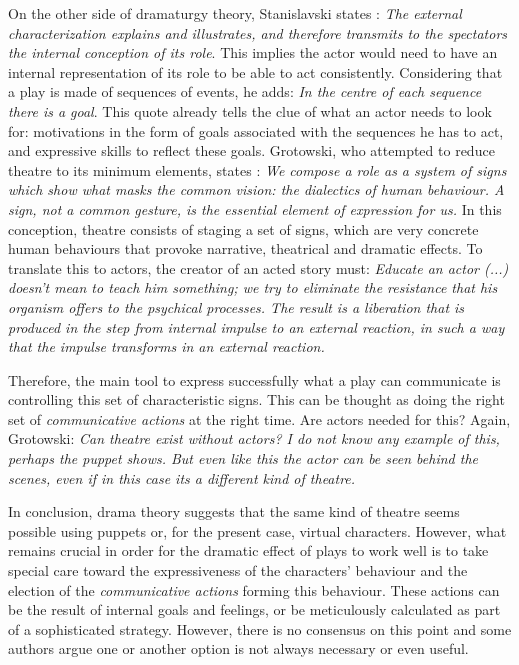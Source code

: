 \documentclass[
		twoside,openright,titlepage,numbers=noenddot,manychapters,
		headinclude,%
                footinclude=false,cleardoublepage=empty,
                BCOR=5mm,
		fontsize=11pt, %
                 enabledeprecatedfontcommands]{scrreprt}
\begin{document}
On the other side of dramaturgy theory, Stanislavski states \cite[]{stanislavski1968building}: \emph{The external characterization explains and illustrates, and therefore transmits to the spectators the internal conception of its role}.
This implies the actor would need to have an internal representation of its role to be able to act consistently. Considering that a play is made of sequences of events, he adds: \emph{
In the centre of each sequence there is a goal}. This quote already tells the clue of what an actor needs to look for: motivations in the form of goals associated with the sequences he has to act, and expressive skills to reflect these goals. Grotowski, who attempted to reduce theatre to its minimum elements, states \cite[]{grotowski-towards}: \emph{
We compose a role as a system of signs which show what masks the common vision: the dialectics of human behaviour. A sign, not a common gesture, is the essential element of expression for us.} In this conception, theatre consists of staging a set of signs, which are very concrete human behaviours that provoke narrative, theatrical and dramatic effects. 
To translate this to actors, the creator of an acted story must: \emph{
Educate an actor (...) doesn't mean to teach him something; we try to eliminate the resistance that his organism offers to the psychical processes. The result is a liberation that is produced in the step from internal impulse to an external reaction, in such a way that the impulse transforms in an external reaction. }

Therefore, the main tool to express successfully what a play can communicate is controlling this set of characteristic signs. This can be thought as doing the right set of \emph{communicative actions} at the right time.
Are actors needed for this? Again, Grotowski: \emph{
Can theatre exist without actors? I do not know any example of this, perhaps the puppet shows. But even like this the actor can be seen behind the scenes, even if in this case its a different kind of theatre.}

In conclusion, drama theory suggests that the same kind of theatre seems possible using puppets or, for the present case, virtual characters. However, what remains crucial in order for the dramatic effect of plays to work well is to take special care toward the expressiveness of the characters' behaviour and the election of the \emph{communicative actions} forming this behaviour. These actions can be the result of internal goals and feelings, or be meticulously calculated as part of a sophisticated strategy. However, there is no consensus on this point and some authors argue one or another option is not always necessary or even useful.
\end{document}
